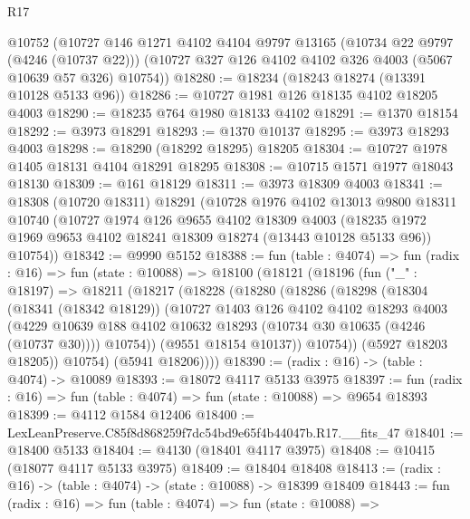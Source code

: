 \begin{lexlean}{R17}
\begin{coremodule}
    @10752
    (@10727
      @146
      @1271
      @4102
      @4104
      @9797
      @13165
      (@10734 @22 @9797 (@4246 (@10737 @22)))
      (@10727 @327 @126 @4102 @4102 @326 @4003 (@5067 @10639 @57 @326) @10754))
@18280 := @18234 (@18243 @18274 (@13391 @10128 @5133 @96))
@18286 := @10727 @1981 @126 @18135 @4102 @18205 @4003
@18290 := @18235 @764 @1980 @18133 @4102
@18291 := @1370 @18154
@18292 := @3973 @18291
@18293 := @1370 @10137
@18295 := @3973 @18293 @4003
@18298 := @18290 (@18292 @18295) @18205
@18304 := @10727 @1978 @1405 @18131 @4104 @18291 @18295
@18308 := @10715 @1571 @1977 @18043 @18130
@18309 := @161 @18129
@18311 := @3973 @18309 @4003
@18341 := @18308
    (@10720 @18311)
    @18291
    (@10728
      @1976
      @4102
      @13013
      @9800
      @18311
      @10740
      (@10727
        @1974
        @126
        @9655
        @4102
        @18309
        @4003
        (@18235 @1972 @1969 @9653 @4102 @18241 @18309 @18274 (@13443 @10128 @5133 @96))
        @10754))
@18342 := @9990 @5152
@18388 := fun (table : @4074) =>
  fun (radix : @16) =>
  fun (state : @10088) =>
  @18100
    (@18121
      (@18196
        (fun ("_" : @18197) =>
        @18211
          (@18217
            (@18228
              (@18280
                (@18286
                  (@18298
                    (@18304
                      (@18341 (@18342 @18129))
                      (@10727
                        @1403
                        @126
                        @4102
                        @4102
                        @18293
                        @4003
                        (@4229
                          @10639
                          @188
                          @4102
                          @10632
                          @18293
                          (@10734 @30 @10635 (@4246 (@10737 @30))))
                        @10754))
                    (@9551 @18154 @10137))
                  @10754))
              (@5927 @18203 @18205))
            @10754)
          (@5941 @18206))))
@18390 := (radix : @16) -> (table : @4074) -> @10089
@18393 := @18072 @4117 @5133 @3975
@18397 := fun (radix : @16) => fun (table : @4074) => fun (state : @10088) => @9654 @18393
@18399 := @4112 @1584 @12406
@18400 := LexLeanPreserve.C85f8d868259f7dc54bd9e65f4b44047b.R17.__fits_47
@18401 := @18400 @5133
@18404 := @4130 (@18401 @4117 @3975)
@18408 := @10415 (@18077 @4117 @5133 @3975)
@18409 := @18404 @18408
@18413 := (radix : @16) -> (table : @4074) -> (state : @10088) -> @18399 @18409
@18443 := fun (radix : @16) =>
  fun (table : @4074) =>
  fun (state : @10088) =>

\end{coremodule}
\end{lexlean}
